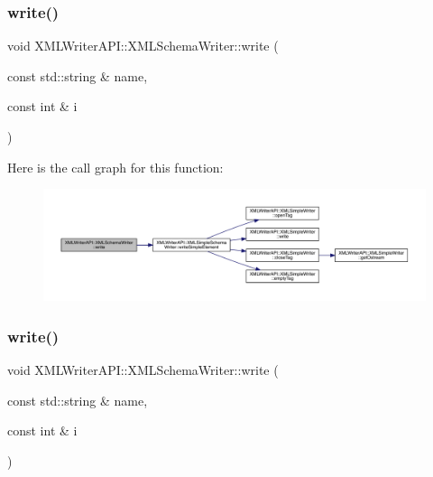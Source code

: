 \subsubsection{\texorpdfstring{write()}{write()}\hspace{0.1cm}{\footnotesize\ttfamily [5/15]}}
{\footnotesize\ttfamily void X\+M\+L\+Writer\+A\+P\+I\+::\+X\+M\+L\+Schema\+Writer\+::write (\begin{DoxyParamCaption}\item[{const std\+::string \&}]{name,  }\item[{const int \&}]{i }\end{DoxyParamCaption})\hspace{0.3cm}{\ttfamily [inline]}}

Here is the call graph for this function\+:
\nopagebreak
\begin{figure}[H]
\begin{center}
\leavevmode
\includegraphics[width=350pt]{db/d34/classXMLWriterAPI_1_1XMLSchemaWriter_a1b951af62e2106b76e33022c0f1b5d88_cgraph}
\end{center}
\end{figure}
\mbox{\label{classXMLWriterAPI_1_1XMLSchemaWriter_a1b951af62e2106b76e33022c0f1b5d88}} 
\subsubsection{\texorpdfstring{write()}{write()}\hspace{0.1cm}{\footnotesize\ttfamily [6/15]}}
{\footnotesize\ttfamily void X\+M\+L\+Writer\+A\+P\+I\+::\+X\+M\+L\+Schema\+Writer\+::write (\begin{DoxyParamCaption}\item[{const std\+::string \&}]{name,  }\item[{const int \&}]{i }\end{DoxyParamCaption})\hspace{0.3cm}{\ttfamily [inline]}}

